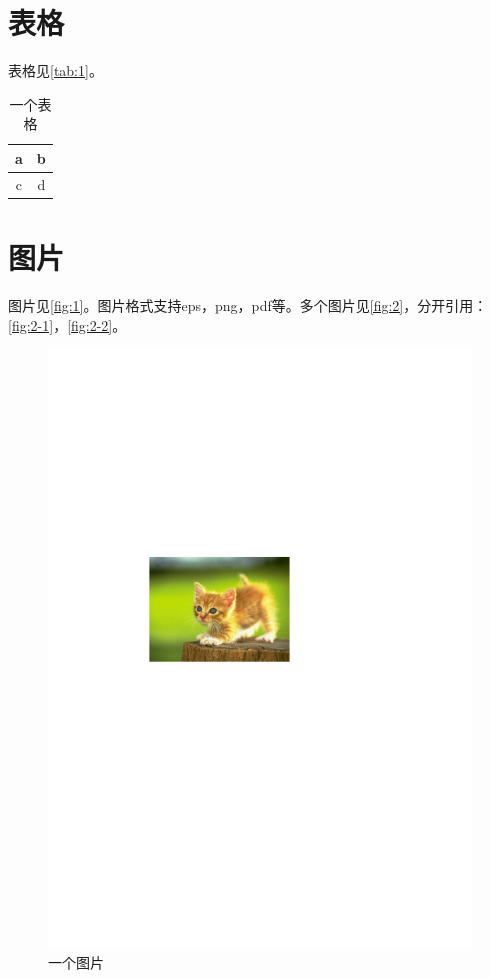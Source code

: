 \documentclass[format=draft,language=chinese,category=SDN]{hustreport}
\begin{document}
\section{表格}
表格见\autoref{tab:1}。

\begin{table}[!h]
\centering
\caption{一个表格}\label{tab:1}
\begin{tabular}{|c|c|}
\hline
a & b \\
\hline
c & d \\
\hline
\end{tabular}
\end{table}
\section{图片}
图片见\autoref{fig:1}。图片格式支持eps，png，pdf等。多个图片见\autoref{fig:2}，分开引用：\autoref{fig:2-1}，\autoref{fig:2-2}。

\begin{figure}[!h]
\centering
\includegraphics[width=.4\textwidth]{fig/fig-example.pdf}
\caption{一个图片}\label{fig:1}
\end{figure}
\end{document}
